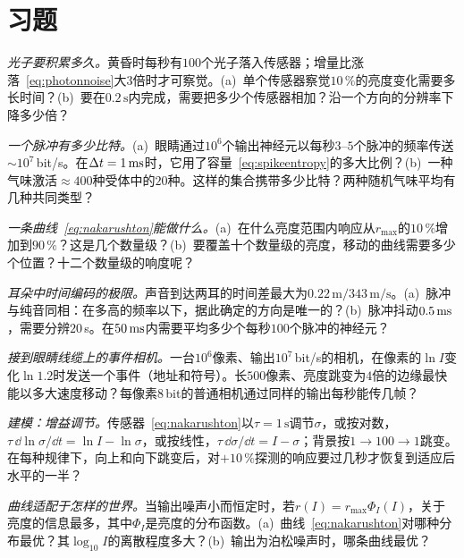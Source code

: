 \section{习题}

\begin{exercise}[\lvlA]
\label{ex:11:1}
\emph{光子要积累多久。}黄昏时每秒有$100$个光子落入传感器；增量比涨落~\eqref{eq:photonnoise}大$3$倍时才可察觉。(a)~单个传感器察觉$10\,\%$的亮度变化需要多长时间？(b)~要在$0.2\,\text{s}$内完成，需要把多少个传感器相加？沿一个方向的分辨率下降多少倍？
\end{exercise}

\begin{exercise}[\lvlA]
\label{ex:11:2}
\emph{一个脉冲有多少比特。}(a)~眼睛通过$10^6$个输出神经元以每秒$3$--$5$个脉冲的频率传送$\sim10^7$\,bit/s。在$\Delta t=1\,\text{ms}$时，它用了容量~\eqref{eq:spikeentropy}的多大比例？(b)~一种气味激活$\approx400$种受体中的$20$种。这样的集合携带多少比特？两种随机气味平均有几种共同类型？
\end{exercise}

\begin{exercise}[\lvlB]
\label{ex:11:3}
\emph{一条曲线~\eqref{eq:nakarushton}能做什么。}(a)~在什么亮度范围内响应从$r_{\max}$的$10\,\%$增加到$90\,\%$？这是几个数量级？(b)~要覆盖十个数量级的亮度，移动的曲线需要多少个位置？十二个数量级的响度呢？
\end{exercise}

\begin{exercise}[\lvlB]
\label{ex:11:4}
\emph{耳朵中时间编码的极限。}声音到达两耳的时间差最大为$0.22\,\text{m}/343\,\text{m/s}$。(a)~脉冲与纯音同相：在多高的频率以下，据此确定的方向是唯一的？(b)~脉冲抖动$0.5\,\text{ms}$，需要分辨$20$\,\textmu s。在$50\,\text{ms}$内需要平均多少个每秒$100$个脉冲的神经元？
\end{exercise}

\begin{exercise}[\lvlB]
\label{ex:11:5}
\emph{接到眼睛线缆上的事件相机。}一台$10^6$像素、输出$10^7$\,bit/s的相机，在像素的$\ln I$变化$\ln1.2$时发送一个事件（地址和符号）。长$500$像素、亮度跳变为$4$倍的边缘最快能以多大速度移动？每像素$8$\,bit的普通相机通过同样的输出每秒能传几帧？
\end{exercise}

\begin{exercise}[\lvlB]
\label{ex:11:6}
\emph{建模：增益调节。}传感器~\eqref{eq:nakarushton}以$\tau=1\,\text{s}$调节$\sigma$，或按对数，$\tau\,\dd\ln\sigma/\dd t=\ln I-\ln\sigma$，或按线性，$\tau\,\dd\sigma/\dd t=I-\sigma$；背景按$1\to100\to1$跳变。在每种规律下，向上和向下跳变后，对$+10\,\%$探测的响应要过几秒才恢复到适应后水平的一半？
\end{exercise}

\begin{exercise}[\lvlC]
\label{ex:11:7}
\emph{曲线适配于怎样的世界。}当输出噪声小而恒定时，若$r(I)=r_{\max}\Phi_I(I)$，关于亮度的信息最多，其中$\Phi_I$是亮度的分布函数。(a)~曲线~\eqref{eq:nakarushton}对哪种分布最优？其$\log_{10}I$的离散程度多大？(b)~输出为泊松噪声时，哪条曲线最优？
\end{exercise}

